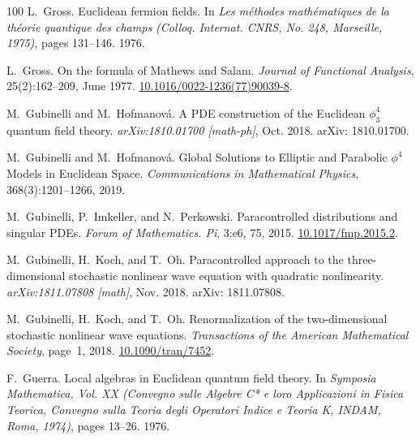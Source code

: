 \documentclass[11pt]{article}
\newcommand{\tmtextit}[1]{{\itshape{#1}}}
\begin{document}
\begin{thebibliography}{100}
  L.~Gross. {\newblock}Euclidean fermion
  fields. {\newblock}In \tmtextit{Les m{\'e}thodes math{\'e}matiques de la
  th{\'e}orie quantique des champs (Colloq. Internat. CNRS, No. 248,
  Marseille, 1975)}, pages 131--146. 1976.
  
  L.~Gross. {\newblock}On the formula of
  Mathews and Salam. {\newblock}\tmtextit{Journal of Functional Analysis},
  25(2):162--209, June 1977. {\newblock}
  \href{https://doi.org/10.1016/0022-1236(77)90039-8}{10.1016/0022-1236(77)90039-8}.
  
  M.~Gubinelli and M.~Hofmanov{\'a}.
  {\newblock}A PDE construction of the Euclidean $\phi^4_3$ quantum field
  theory. {\newblock}\tmtextit{arXiv:1810.01700 [math-ph]}, Oct. 2018.
  {\newblock}arXiv: 1810.01700.
  
  M.~Gubinelli and M.~Hofmanov{\'a}.
  {\newblock}Global Solutions to Elliptic and Parabolic $\phi^4$ Models in
  Euclidean Space. {\newblock}\tmtextit{Communications in Mathematical
  Physics}, 368(3):1201--1266, 2019.
  
  M.~Gubinelli, P.~Imkeller, and
  N.~Perkowski. {\newblock}Paracontrolled distributions and singular PDEs.
  {\newblock}\tmtextit{Forum of Mathematics. Pi}, 3:e6, 75, 2015.
  {\newblock}\href{https://doi.org/10.1017/fmp.2015.2}{10.1017/fmp.2015.2}.
  
  M.~Gubinelli, H.~Koch, and T.~Oh.
  {\newblock}Paracontrolled approach to the three-dimensional stochastic
  nonlinear wave equation with quadratic nonlinearity.
  {\newblock}\tmtextit{arXiv:1811.07808 [math]}, Nov. 2018. {\newblock}arXiv:
  1811.07808.
  
  M.~Gubinelli, H.~Koch, and
  T.~Oh. {\newblock}Renormalization of the two-dimensional stochastic
  nonlinear wave equations. {\newblock}\tmtextit{Transactions of the American
  Mathematical Society}, page~1, 2018.
  {\newblock}\href{https://doi.org/10.1090/tran/7452}{10.1090/tran/7452}.
  
  F.~Guerra. {\newblock}Local algebras in Euclidean
  quantum field theory. {\newblock}In \tmtextit{Symposia Mathematica, Vol. XX
  (Convegno sulle Algebre C* e loro Applicazioni in Fisica Teorica, Convegno
  sulla Teoria degli Operatori Indice e Teoria K, INDAM, Roma, 1974)}, pages
  13--26. 1976.
  

\end{thebibliography}
\end{document}
